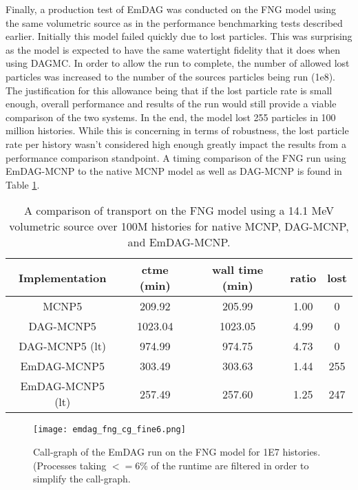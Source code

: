 Finally, a production test of EmDAG was conducted on the FNG model using the
same volumetric source as in the performance benchmarking tests described
earlier. Initially this model failed quickly due to lost particles. This was
surprising as the model is expected to have the same watertight fidelity that it
does when using DAGMC. In order to allow the run to complete, the number of
allowed lost particles was increased to the number of the sources particles
being run (1e8). The justification for this allowance being that if the lost
particle rate is small enough, overall performance and results of the run would
still provide a viable comparison of the two systems. In the end, the model lost
255 particles in 100 million histories. While this is concerning in terms of
robustness, the lost particle rate per history wasn't considered high enough
greatly impact the results from a performance comparison standpoint. A timing
comparison of the FNG run using EmDAG-MCNP to the native MCNP model as well as
DAG-MCNP is found in Table \ref{fngemdag}.

\begin{table}[H]
  \small
  \begin{center}
        \begin{tabular}{|c|c|c|c|c|}
      \hline
      \textbf{Implementation} & \textbf{ctme (min)} & \textbf{wall time (min)} & \textbf{ratio} & \textbf{lost} \\
      \hline
      MCNP5 & 209.92 & 205.99 &  1.00 & 0 \\
      \hline
      DAG-MCNP5 & 1023.04 & 1023.05 & 4.99 & 0  \\
      \hline
      DAG-MCNP5 (lt) & 974.99 & 974.75 & 4.73 & 0  \\
      \hline      
      EmDAG-MCNP5 & 303.49 & 303.63 & 1.44 & 255  \\
      \hline
      EmDAG-MCNP5 (lt) & 257.49 & 257.60  & 1.25 & 247 \\
      \hline
    \end{tabular} 
    \caption{A comparison of transport on the FNG model using a 14.1 MeV
      volumetric source over 100M histories for native MCNP, DAG-MCNP, and
      EmDAG-MCNP.}
    \label{fngemdag}
  \end{center}
\end{table}


\begin{figure}
  \centering
  \texttt{[image: emdag\_fng\_cg\_fine6.png]}
  \caption{Call-graph of the EmDAG run on the FNG model for 1E7
    histories. (Processes taking $<=$6\% of the runtime are filtered in order to
    simplify the call-graph.}
  \label{emdag-fng-coarse}  
\end{figure}

